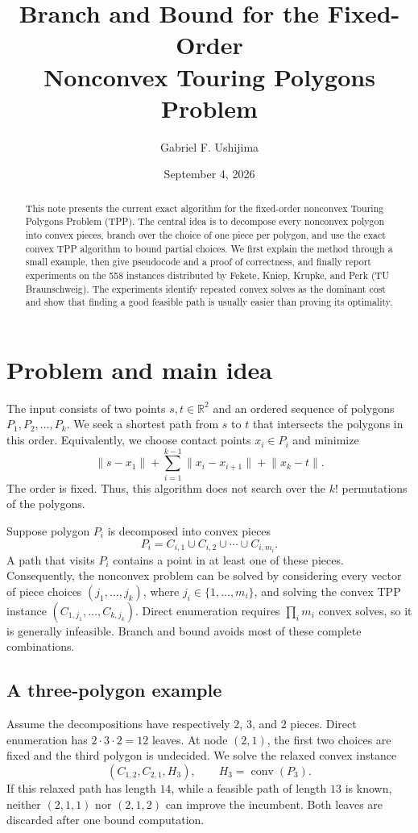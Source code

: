 \documentclass[11pt]{article}
\title{\textbf{Branch and Bound for the Fixed-Order\\Nonconvex Touring Polygons Problem}}
\author{Gabriel F. Ushijima}
\date{September 4, 2026}
\newcommand{\R}{\mathbb{R}}
\newcommand{\conv}{\operatorname{conv}}
\begin{document}
\maketitle

\begin{abstract}
This note presents the current exact algorithm for the fixed-order nonconvex
Touring Polygons Problem (TPP). The central idea is to decompose every
nonconvex polygon into convex pieces, branch over the choice of one piece per
polygon, and use the exact convex TPP algorithm to bound partial choices. We
first explain the method through a small example, then give pseudocode and a
proof of correctness, and finally report experiments on the 558 instances
distributed by Fekete, Kniep, Krupke, and Perk (TU Braunschweig). The
experiments identify repeated convex solves as the dominant cost and show that
finding a good feasible path is usually easier than proving its optimality.
\end{abstract}

\section{Problem and main idea}

The input consists of two points $s,t\in\R^2$ and an ordered sequence of
polygons $P_1,P_2,\ldots,P_k$. We seek a shortest path from $s$ to $t$ that
intersects the polygons in this order. Equivalently, we choose contact points
$x_i\in P_i$ and minimize
\[
	\lVert s-x_1\rVert+\sum_{i=1}^{k-1}\lVert x_i-x_{i+1}\rVert+\lVert x_k-t\rVert.
\]
The order is fixed. Thus, this algorithm does not search over the $k!$
permutations of the polygons.

Suppose polygon $P_i$ is decomposed into convex pieces
\[
	P_i=C_{i,1}\cup C_{i,2}\cup\cdots\cup C_{i,m_i}.
\]
A path that visits $P_i$ contains a point in at least one of these pieces.
Consequently, the nonconvex problem can be solved by considering every vector
of piece choices $(j_1,\ldots,j_k)$, where
$j_i\in\{1,\ldots,m_i\}$, and solving the convex TPP instance
$(C_{1,j_1},\ldots,C_{k,j_k})$. Direct enumeration requires $\prod_i m_i$
convex solves, so it is generally infeasible. Branch and bound avoids most of
these complete combinations.

\subsection{A three-polygon example}

Assume the decompositions have respectively $2$, $3$, and $2$ pieces. Direct
enumeration has $2\cdot3\cdot2=12$ leaves. At node $(2,1)$, the first two
choices are fixed and the third polygon is undecided. We solve the relaxed
convex instance
\[
	(C_{1,2},C_{2,1},H_3),\qquad H_3=\conv(P_3).
\]
If this relaxed path has length $14$, while a feasible path of length $13$ is
known, neither $(2,1,1)$ nor $(2,1,2)$ can improve the incumbent. Both leaves
are discarded after one bound computation.
\end{document}
